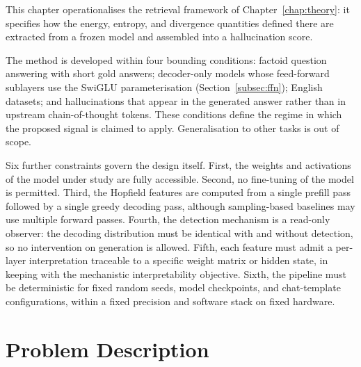 
\label{chap:methods}

This chapter operationalises the retrieval framework of
Chapter~\ref{chap:theory}: it specifies how the energy, entropy, and
divergence quantities defined there are extracted from a frozen model and
assembled into a hallucination score.

The method is developed within four bounding conditions: factoid question
answering with short gold answers; decoder-only models whose feed-forward
sublayers use the SwiGLU parameterisation (Section~\ref{subsec:ffn}); English
datasets; and hallucinations that appear in the generated answer rather than
in upstream chain-of-thought tokens. These conditions define the regime in
which the proposed signal is claimed to apply. Generalisation to other tasks
is out of scope.

Six further constraints govern the design itself. First, the weights and
activations of the model under study are fully accessible. Second, no
fine-tuning of the model is permitted. Third, the Hopfield features are
computed from a single prefill pass followed by a single greedy decoding
pass, although sampling-based baselines may use multiple forward passes.
Fourth, the detection mechanism is a read-only observer: the decoding
distribution must be identical with and without detection, so no
intervention on generation is allowed. Fifth, each feature must admit a
per-layer interpretation traceable to a specific weight matrix or hidden
state, in keeping with the mechanistic interpretability objective. Sixth,
the pipeline must be deterministic for fixed random seeds, model
checkpoints, and chat-template configurations, within a fixed precision and
software stack on fixed hardware.

\section{Problem Description}
\label{sec:problem_description}


